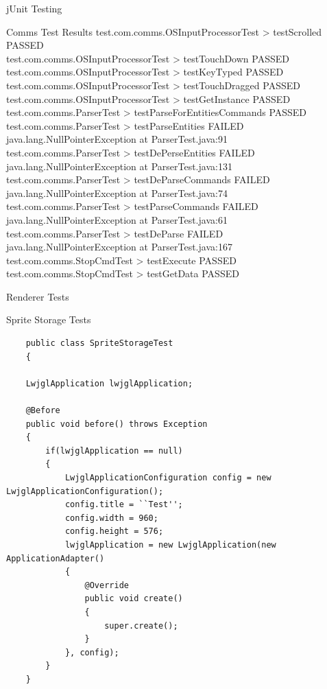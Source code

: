 \documentclass[12pt]{report}
\begin{document}
\begin{chapter}{jUnit Testing}
\begin{section}{Comms Test Results}
  	test.com.comms.OSInputProcessorTest > testScrolled PASSED\\
	test.com.comms.OSInputProcessorTest > testTouchDown PASSED\\
	test.com.comms.OSInputProcessorTest > testKeyTyped PASSED\\
	test.com.comms.OSInputProcessorTest > testTouchDragged PASSED\\
	test.com.comms.OSInputProcessorTest > testGetInstance PASSED\\
	test.com.comms.ParserTest > testParseForEntitiesCommands PASSED\\
	test.com.comms.ParserTest > testParseEntities FAILED\\
    		java.lang.NullPointerException at ParserTest.java:91\\
	test.com.comms.ParserTest > testDePerseEntities FAILED\\
    		java.lang.NullPointerException at ParserTest.java:131\\
	test.com.comms.ParserTest > testDeParseCommands FAILED\\
    		java.lang.NullPointerException at ParserTest.java:74\\
	test.com.comms.ParserTest > testParseCommands FAILED\\
    		java.lang.NullPointerException at ParserTest.java:61\\
	test.com.comms.ParserTest > testDeParse FAILED\\
    		java.lang.NullPointerException at ParserTest.java:167\\
	test.com.comms.StopCmdTest > testExecute PASSED\\
	test.com.comms.StopCmdTest > testGetData PASSED\\
  \end{section}
  
  
  \begin{section}{Renderer Tests}
   \begin{subsection}{Sprite Storage Tests}
    \begin{lstlisting}
    public class SpriteStorageTest
    {

    LwjglApplication lwjglApplication;

    @Before
    public void before() throws Exception
    {
        if(lwjglApplication == null)
        {
            LwjglApplicationConfiguration config = new LwjglApplicationConfiguration();
            config.title = ``Test'';
            config.width = 960;
            config.height = 576;
            lwjglApplication = new LwjglApplication(new ApplicationAdapter()
            {
                @Override
                public void create()
                {
                    super.create();
                }
            }, config);
        }
    }
    

\end{lstlisting}
\end{subsection}
\end{section}
\end{chapter}
\end{document}
